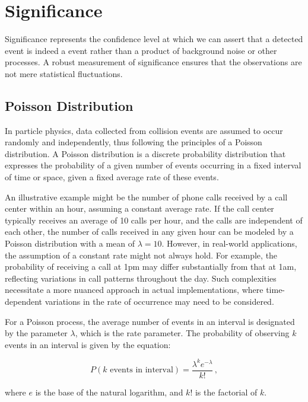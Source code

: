 \section{Significance}

Significance represents the confidence level at which we can assert that a detected event is
indeed a \tth event rather than a product of background noise or other processes. A robust measurement of significance
ensures that the observations are not mere statistical fluctuations.

\subsection{Poisson Distribution}

In particle physics, data collected from collision events are assumed to occur randomly and independently, thus
following the principles of a Poisson distribution. A Poisson distribution is a discrete probability distribution that
expresses the probability of a given number of events occurring in a fixed interval of time or space, given a fixed
average rate of these events.

An illustrative example might be the number of phone calls received by a call center within an hour, assuming a constant
average rate. If the call center typically receives an average of 10 calls per hour, and the calls are independent of
each other, the number of calls received in any given hour can be modeled by a Poisson distribution with a mean of
$\lambda = 10$. However, in real-world applications, the assumption of a constant rate might not always hold. For
example, the probability of receiving a call at 1pm may differ substantially from that at 1am, reflecting variations in
call patterns throughout the day. Such complexities necessitate a more nuanced approach in actual implementations, where
time-dependent variations in the rate of occurrence may need to be considered.

For a Poisson process, the average number of events in an interval is designated by the parameter
$\lambda$, which is
the rate parameter. The probability of observing $k$ events in an interval is given by the equation:

\begin{equation}
    P(k \text{ events in interval}) = \frac{\lambda^k e^{-\lambda}}{k!}\,,
\end{equation}

where $e$ is the base of the natural logarithm, and $k!$ is the factorial of $k$.

